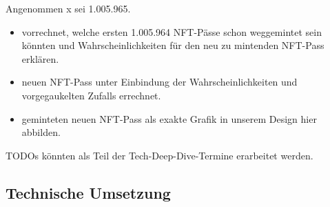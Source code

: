 
\vspace{0.2cm}

Angenommen x sei 1.005.965.

\begin{itemize}
  \item vorrechnet, welche ersten 1.005.964 NFT-Pässe schon weggemintet sein könnten und Wahrscheinlichkeiten für den neu zu mintenden NFT-Pass erklären.
  \item neuen NFT-Pass unter Einbindung der Wahrscheinlichkeiten und vorgegaukelten Zufalls errechnet.
  \item geminteten neuen NFT-Pass als exakte Grafik in unserem Design hier abbilden.
\end{itemize}


\vspace{0.3cm}




\vspace{0.3cm}

TODOs könnten als Teil der Tech-Deep-Dive-Termine erarbeitet werden.

\vspace{0.3cm}

\subsection{Technische Umsetzung}

\vspace{0.3cm}


\vspace{0.3cm}

